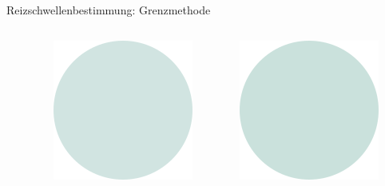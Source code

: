 \documentclass[aspectratio=169]{beamer}
\begin{document}
\begin{frame}{Reizschwellenbestimmung: Grenzmethode}
\begin{columns}[c]
\begin{column}{1cm}
\end{column}
\begin{column}{1cm}
\includegraphics[width=\textwidth]{reizschwelle_seriell_7.png}
\end{column}
\begin{column}{1cm}
\includegraphics[width=\textwidth]{reizschwelle_seriell_8.png}

\end{column}
\end{columns}
\end{frame}
\end{document}
